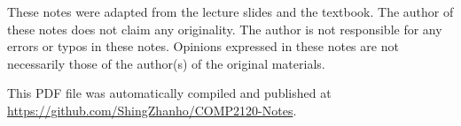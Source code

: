 \begin{remark}
    
These notes were adapted from the lecture slides and the textbook. The author of these notes
does not claim any originality. The author is not responsible for any errors or typos in these notes.
Opinions expressed in these notes are not necessarily those of the author(s) of the original materials.

This PDF file was automatically compiled and published at 
\textcolor{blue}{\url{https://github.com/ShingZhanho/COMP2120-Notes}}.

\end{remark}